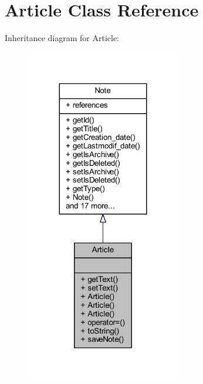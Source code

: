 \hypertarget{class_article}{}\section{Article Class Reference}
\label{class_article}


Inheritance diagram for Article\+:
\nopagebreak
\begin{figure}[H]
\begin{center}
\leavevmode
\includegraphics[width=191pt]{class_article__inherit__graph}
\end{center}
\end{figure}


